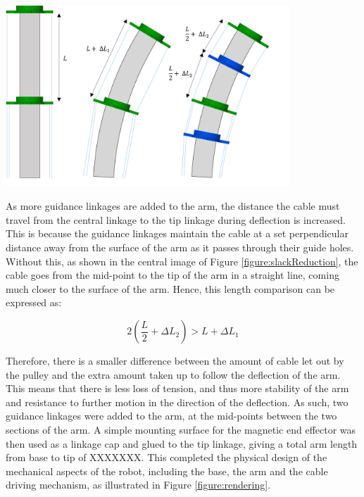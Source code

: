 \documentclass[11pt]{article}
\begin{document}
\begin{center}
\includegraphics[width=0.8\textwidth]{images/slackReduction.png}
\label{figure:slackReduction}
\end{center}

As more guidance linkages are added to the arm, the distance the cable must travel from the central linkage to the tip linkage during deflection is increased. This is because the guidance linkages maintain the cable at a set perpendicular distance away from the surface of the arm as it passes through their guide holes. Without this, as shown in the central image of Figure \ref{figure:slackReduction}, the cable goes from the mid-point to the tip of the arm in a straight line, coming much closer to the surface of the arm. Hence, this length comparison can be expressed as:



\begin{equation}\label{equation:guidanceLength}
2(\frac{L}{2} + \Delta L_{2}) > L + \Delta L_{1}
\end{equation}

Therefore, there is a smaller difference between the amount of cable let out by the pulley and the extra amount taken up to follow the deflection of the arm. This means that there is less loss of tension, and thus more stability of the arm and resistance to further motion in the direction of the deflection. As such, two guidance linkages were added to the arm, at the mid-points between the two sections of the arm. A simple mounting surface for the magnetic end effector was then used as a linkage cap and glued to the tip linkage, giving a total arm length from base to tip of XXXXXXX. This completed the physical design of the mechanical aspects of the robot, including the base, the arm and the cable driving mechanism, as illustrated in Figure \ref{figure:rendering}.
\end{document}

